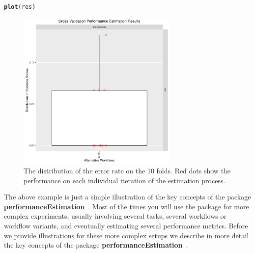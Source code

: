 \documentclass[10pt,a4paper]{article}\usepackage[]{graphicx}\usepackage[]{color}
\makeatletter
\newcommand{\hlstd}[1]{\textcolor[rgb]{0.345,0.345,0.345}{#1}}%
\newcommand{\hlkwd}[1]{\textcolor[rgb]{0.737,0.353,0.396}{\textbf{#1}}}%
\newenvironment{kframe}{%
 \def\at@end@of@kframe{}%
 \ifinner\ifhmode%
  \def\at@end@of@kframe{\end{minipage}}%
  \begin{minipage}{\columnwidth}%
 \fi\fi%
 \def\FrameCommand##1{\hskip\@totalleftmargin \hskip-\fboxsep
 \colorbox{shadecolor}{##1}\hskip-\fboxsep
     \hskip-\linewidth \hskip-\@totalleftmargin \hskip\columnwidth}%
 \MakeFramed {\advance\hsize-\width
   \@totalleftmargin\z@ \linewidth\hsize
   \@setminipage}}%
 {\par\unskip\endMakeFramed%
 \at@end@of@kframe}
\newenvironment{knitrout}{}{} %
\newcommand{\PE}{package \textbf{performanceEstimation}\ }
\makeatother
\begin{document}
\begin{knitrout}\footnotesize
{}\color{fgcolor}\begin{kframe}
\begin{alltt}
\hlkwd{plot}\hlstd{(res)}
\end{alltt}
\end{kframe}\begin{figure}

{\centering \includegraphics[width=0.7\textwidth]{figures/perfEst-ex1Iris-1} 

}

\caption[The distribution of the error rate on the 10 folds]{The distribution of the error rate on the 10 folds. Red dots show the performance on each individual iteration of the estimation process.}\label{fig:ex1Iris}
\end{figure}


\end{knitrout}



The above  example is just a simple illustration of the key concepts of the \PE. Most of the times you will use the package for more complex experiments, usually involving several tasks, several workflows or workflow variants, and eventually estimating several performance metrics. Before we provide illustrations for these more complex setups we describe in more detail the key concepts of the \PE.
\end{document}
